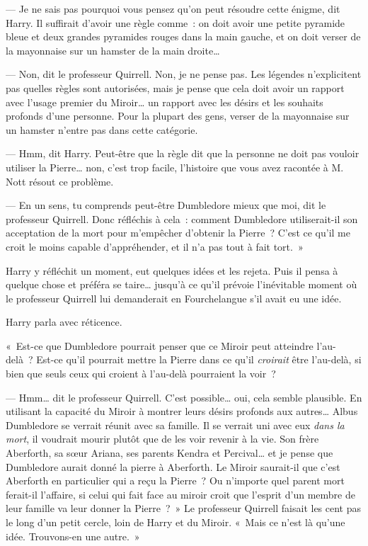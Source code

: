 --- Je ne sais pas pourquoi vous pensez qu'on peut résoudre cette énigme, dit Harry. Il suffirait d'avoir une règle comme~: on doit avoir une petite pyramide bleue et deux grandes pyramides rouges dans la main gauche, et on doit verser de la mayonnaise sur un hamster de la main droite…

--- Non, dit le professeur Quirrell. Non, je ne pense pas. Les légendes n'explicitent pas quelles règles sont autorisées, mais je pense que cela doit avoir un rapport avec l'usage premier du Miroir… un rapport avec les désirs et les souhaits profonds d'une personne. Pour la plupart des gens, verser de la mayonnaise sur un hamster n'entre pas dans cette catégorie.

--- Hmm, dit Harry. Peut-être que la règle dit que la personne ne doit pas vouloir utiliser la Pierre… non, c'est trop facile, l'histoire que vous avez racontée à M. Nott résout ce problème.

--- En un sens, tu comprends peut-être Dumbledore mieux que moi, dit le professeur Quirrell. Donc réfléchis à cela~: comment Dumbledore utiliserait-il son acceptation de la mort pour m'empêcher d'obtenir la Pierre~? C'est ce qu'il me croit le moins capable d'appréhender, et il n'a pas tout à fait tort.~»

Harry y réfléchit un moment, eut quelques idées et les rejeta. Puis il pensa à quelque chose et préféra se taire… jusqu'à ce qu'il prévoie l'inévitable moment où le professeur Quirrell lui demanderait en Fourchelangue s'il avait eu une idée.

Harry parla avec réticence.

«~Est-ce que Dumbledore pourrait penser que ce Miroir peut atteindre l'au-delà~? Est-ce qu'il pourrait mettre la Pierre dans ce qu'il \emph{croirait} être l'au-delà, si bien que seuls ceux qui croient à l'au-delà pourraient la voir~?

--- Hmm… dit le professeur Quirrell. C'est possible… oui, cela semble plausible. En utilisant la capacité du Miroir à montrer leurs désirs profonds aux autres… Albus Dumbledore se verrait réunit avec sa famille. Il se verrait uni avec eux \emph{dans la mort}, il voudrait mourir plutôt que de les voir revenir à la vie. Son frère Aberforth, sa sœur Ariana, ses parents Kendra et Percival… et je pense que Dumbledore aurait donné la pierre à Aberforth. Le Miroir saurait-il que c'est Aberforth en particulier qui a reçu la Pierre~? Ou n'importe quel parent mort ferait-il l'affaire, si celui qui fait face au miroir croit que l'esprit d'un membre de leur famille va leur donner la Pierre~?~» Le professeur Quirrell faisait les cent pas le long d'un petit cercle, loin de Harry et du Miroir. «~Mais ce n'est là qu'une idée. Trouvons-en une autre.~»

